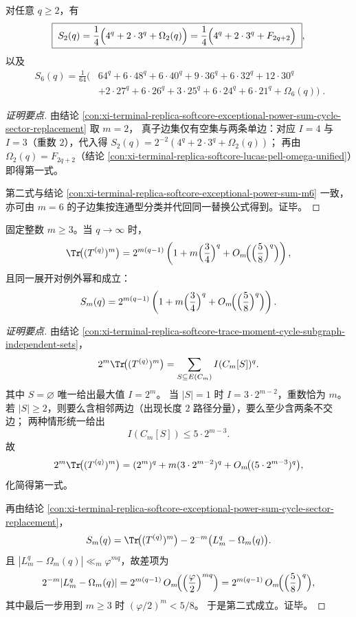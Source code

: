 \begin{conclusion}[低阶例外幂和闭式的统一回收：\(m=2\) 与 \(m=6\)]\label{con:xi-terminal-replica-softcore-exceptional-power-sum-m2-m6-recovered}
对任意 \(q\ge 2\)，有
\[
\boxed{\;
S_2(q)=\frac14\Bigl(4^{q}+2\cdot 3^{q}+\Omega_2(q)\Bigr)
=\frac14\Bigl(4^{q}+2\cdot 3^{q}+F_{2q+2}\Bigr)\; } ,
\]
以及
\[
\boxed{\;
\begin{aligned}
S_6(q)=\frac1{64}\Big(
&64^{q}+6\cdot48^{q}+6\cdot40^{q}+9\cdot36^{q}+6\cdot32^{q}+12\cdot30^{q}\\
&+2\cdot27^{q}+6\cdot26^{q}+3\cdot25^{q}+6\cdot24^{q}+6\cdot21^{q}+\Omega_6(q)
\Big)\; .
\end{aligned}
}
\]
\end{conclusion}
\begin{proof}[证明要点]
由结论 \ref{con:xi-terminal-replica-softcore-exceptional-power-sum-cycle-sector-replacement} 取 \(m=2\)，
真子边集仅有空集与两条单边：对应 \(I=4\) 与 \(I=3\)（重数 \(2\)），代入得
\(
S_2(q)=2^{-2}(4^q+2\cdot 3^q+\Omega_2(q))
\)；
再由 \(\Omega_2(q)=F_{2q+2}\)（结论 \ref{con:xi-terminal-replica-softcore-lucas-pell-omega-unified}）即得第一式。
\par
第二式与结论 \ref{con:xi-terminal-replica-softcore-exceptional-power-sum-m6} 一致，
亦可由 \(m=6\) 的子边集按连通型分类并代回同一替换公式得到。证毕。
\end{proof}

\begin{conclusion}\label{con:xi-terminal-replica-softcore-large-q-two-layer-asymptotics}
固定整数 \(m\ge 3\)。当 \(q\to\infty\) 时，
\[
\Tr\!\bigl((T^{(q)})^m\bigr)
=2^{m(q-1)}
\left(
1+m\Bigl(\frac34\Bigr)^q+O_m\!\Bigl(\Bigl(\frac58\Bigr)^q\Bigr)
\right),
\]
且同一展开对例外幂和成立：
\[
S_m(q)
=2^{m(q-1)}
\left(
1+m\Bigl(\frac34\Bigr)^q+O_m\!\Bigl(\Bigl(\frac58\Bigr)^q\Bigr)
\right).
\]
\end{conclusion}
\begin{proof}[证明要点]
由结论 \ref{con:xi-terminal-replica-softcore-trace-moment-cycle-subgraph-independent-sets}，
\[
2^m\Tr\!\bigl((T^{(q)})^m\bigr)=\sum_{S\subseteq E(C_m)}I(C_m[S])^{q}.
\]
其中 \(S=\varnothing\) 唯一给出最大值 \(I=2^m\)。
当 \(|S|=1\) 时 \(I=3\cdot 2^{m-2}\)，重数恰为 \(m\)。
若 \(|S|\ge 2\)，则要么含相邻两边（出现长度 \(2\) 路径分量），要么至少含两条不交边；
两种情形统一给出
\[
I(C_m[S])\le 5\cdot 2^{m-3}.
\]
故
\[
2^m\Tr\!\bigl((T^{(q)})^m\bigr)
=(2^m)^q+m(3\cdot 2^{m-2})^q+O_m\!\bigl((5\cdot 2^{m-3})^q\bigr),
\]
化简得第一式。
\par
再由结论 \ref{con:xi-terminal-replica-softcore-exceptional-power-sum-cycle-sector-replacement}，
\[
S_m(q)=\Tr\!\bigl((T^{(q)})^m\bigr)-2^{-m}\bigl(L_m^q-\Omega_m(q)\bigr).
\]
且 \(|L_m^q-\Omega_m(q)|\ll_m \varphi^{mq}\)，故差项为
\[
2^{-m}|L_m^q-\Omega_m(q)|
=2^{m(q-1)}\,O_m\!\Bigl(\Bigl(\frac{\varphi}{2}\Bigr)^{mq}\Bigr)
=2^{m(q-1)}\,O_m\!\Bigl(\Bigl(\frac58\Bigr)^q\Bigr),
\]
其中最后一步用到 \(m\ge 3\) 时 \((\varphi/2)^m<5/8\)。
于是第二式成立。证毕。
\end{proof}


